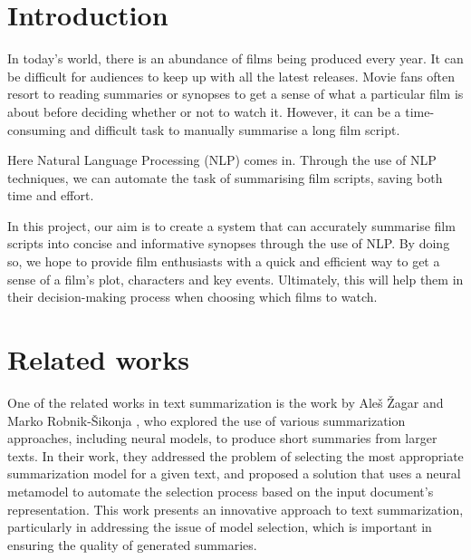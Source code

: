 \documentclass[fleqn,moreauthors,10pt]{ds_report}
\affiliation{\textit{Advisor: Slavko Žitnik}}
\begin{document}
\flushbottom 

\maketitle 

\thispagestyle{empty} 


\section*{Introduction}

In today's world, there is an abundance of films being produced every year. It can be difficult for audiences to keep up with all the latest releases. Movie fans often resort to reading summaries or synopses to get a sense of what a particular film is about before deciding whether or not to watch it. However, it can be a time-consuming and difficult task to manually summarise a long film script.

Here Natural Language Processing (NLP) comes in. Through the use of NLP techniques, we can automate the task of summarising film scripts, saving both time and effort.

In this project, our aim is to create a system that can accurately summarise film scripts into concise and informative synopses through the use of NLP. By doing so, we hope to provide film enthusiasts with a quick and efficient way to get a sense of a film's plot, characters and key events. Ultimately, this will help them in their decision-making process when choosing which films to watch.

\section*{Related works}

One of the related works in text summarization is the work by Aleš Žagar and Marko  Robnik-Šikonja \cite{zagar2022}, who explored the use of various summarization approaches, including neural models, to produce short summaries from larger texts. In their work, they addressed the problem of selecting the most appropriate summarization model for a given text, and proposed a solution that uses a neural metamodel to automate the selection process based on the input document's representation. This work presents an innovative approach to text summarization, particularly in addressing the issue of model selection, which is important in ensuring the quality of generated summaries.
\end{document}
